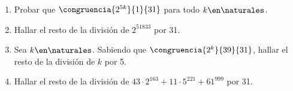 \begin{enunciado}{\ejercicio}
  \begin{enumerate}[label=(\alph*)]

    \item Probar que  $\congruencia{2^{5k}}{1}{31}$ para todo $k \en \naturales$.

    \item Hallar el resto de la división de $2^{51833}$ por 31.

    \item Sea $k \en \naturales$. Sabiendo que $\congruencia{2^k}{39}{31}$, hallar el resto de la división de $k$ por 5.

    \item Hallar el resto de la división de $43 \cdot 2^{163} + 11 \cdot 5^{221} + 61^{999}$ por 31.

  \end{enumerate}
\end{enunciado}

